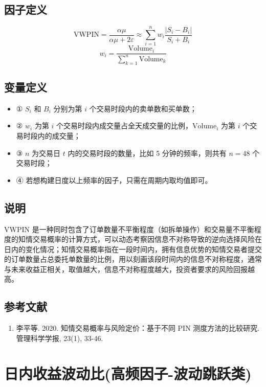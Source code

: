 \documentclass{article}
\begin{document}
\subsection{因子定义}
\begin{equation}
    \mathrm{VWPIN} = \frac{\alpha\mu}{\alpha\mu + 2\varepsilon} \approx \sum_{i=1}^{n} w_i \frac{|S_i - B_i|}{S_i + B_i}
\end{equation}
\begin{equation}
    w_i = \frac{\mathrm{Volume}_i}{\sum_{k=1}^{n} \mathrm{Volume}_k}
\end{equation}

\subsection{变量定义}
\begin{itemize}
    \item ① \( S_i \) 和 \( B_i \) 分别为第 \( i \) 个交易时段内的卖单数和买单数；
    \item ② \( w_i \) 为第 \( i \) 个交易时段内成交量占全天成交量的比例，\( \mathrm{Volume}_i \) 为第 \( i \) 个交易时段内的成交量；
    \item ③ \( n \) 为交易日 \( t \) 内的交易时段的数量，比如 5 分钟的频率，则共有 \( n=48 \) 个交易时段；
    \item ④ 若想构建日度以上频率的因子，只需在周期内取均值即可。
\end{itemize}

\subsection{说明}
VWPIN 是一种同时包含了订单数量不平衡程度（如拆单操作）和交易量不平衡程度的知情交易概率的计算方式，可以动态考察因信息不对称导致的逆向选择风险在日内的变化情况；知情交易概率指在一段时间内，拥有信息优势的知情交易者提交的订单数量占总委托单数量的比例，用以刻画该段时间内的信息不对称程度，通常与未来收益正相关，取值越大，信息不对称程度越大，投资者要求的风险回报越高。

\subsection{参考文献}
\begin{enumerate}
    \item 李平等. 2020. 知情交易概率与风险定价：基于不同 PIN 测度方法的比较研究. 管理科学学报, 23(1), 33-46.
\end{enumerate}

\section{日内收益波动比(高频因子-波动跳跃类)}
\end{document}
